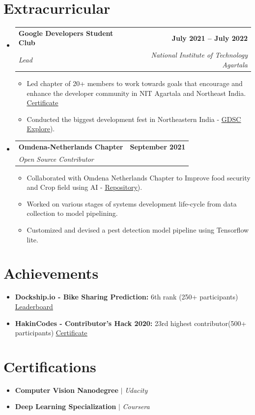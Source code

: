 \documentclass[letterpaper,11pt]{article}
\makeatletter
\newcommand{\resumeItem}[1]{
  \item\small{
    {#1 \vspace{-2pt}}
  }
}
\newcommand{\resumeSubheading}[4]{
  \vspace{-2pt}\item
    \begin{tabular*}{1.0\textwidth}[t]{l@{\extracolsep{\fill}}r}
      \textbf{#1} & \textbf{\small #2} \\
      \textit{\small#3} & \textit{\small #4} \\
    \end{tabular*}\vspace{-7pt}
}
\newcommand{\resumeSubHeadingListStart}{\begin{itemize}[leftmargin=0.0in, label={}]}
\newcommand{\resumeSubHeadingListEnd}{\end{itemize}}
\newcommand{\resumeItemListStart}{\begin{itemize}}
\newcommand{\resumeItemListEnd}{\end{itemize}\vspace{-5pt}}
\makeatother
\begin{document}
\section{Extracurricular}
    \resumeSubHeadingListStart
        \resumeSubheading{Google Developers Student Club}{July 2021 -- July 2022}{Lead}{National Institute of Technology Agartala}
            \resumeItemListStart
                \resumeItem{Led chapter of 20+ members to work towards goals that encourage and enhance the developer community in NIT Agartala and Northeast India. \href{https://drive.google.com/file/d/1RKPOSUSs8iFrDiuJr9A6C6-vN_c4Hmso/view?usp=sharing}{\color{blue}\underline{Certificate}}}
                \resumeItem{Conducted the biggest development fest in Northeastern India - \href{https://www.gdscexplore.live/}{\color{blue}\underline{GDSC Explore}}).}
            \resumeItemListEnd
        \resumeSubheading{Omdena-Netherlands Chapter}{September 2021}{Open Source Contributor}{}
            \resumeItemListStart
                \resumeItem{Collaborated with Omdena Netherlands Chapter to Improve food security and Crop field using AI - \href{https://dagshub.com/Omdena/Circular-Economy}{\color{blue}\underline{Repository}}).}
                \resumeItem{Worked on various stages of systems development life-cycle from data collection to model pipelining.}
                \resumeItem{Customized and devised a pest detection model pipeline using Tensorflow lite.}
            \resumeItemListEnd
    \resumeSubHeadingListEnd
\section{Achievements}
\resumeSubHeadingListStart
\resumeItem{\textbf{Dockship.io - Bike Sharing Prediction:}{ 6th rank (250+
participants)} {\href{https://dockship.io/challenges/5fda57ed5f392d4d66289209/bike-sharing-demand-prediction-ai-challenge-/leaderboard}{\color{blue}\underline{Leaderboard}}}}
\vspace{-2pt}
\resumeItem{\textbf{HakinCodes - Contributor's Hack 2020:}{ 23rd highest contributor(500+ participants) \href{https://drive.google.com/file/d/1aN_u-vkW0mpaRquJ4D0pRVFucAPlKWUS/view?usp=sharing}{\color{blue}\underline{Certificate}}}}
\resumeSubHeadingListEnd
\section{Certifications}
\resumeItemListStart
\resumeItem{\textbf{Computer Vision Nanodegree} $|$ \emph{Udacity}}
\vspace{-2pt}
\resumeItem{\textbf{Deep Learning Specialization} $|$ \emph{Coursera}} 
\resumeItemListEnd
\end{document}
